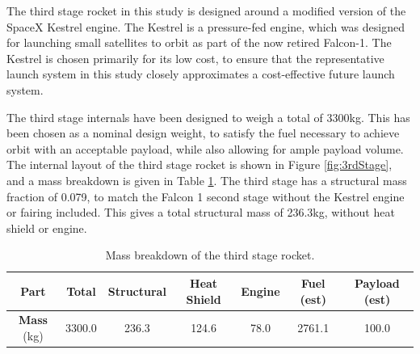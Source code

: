   The third stage rocket in this study is designed around a modified version of the SpaceX Kestrel engine. The Kestrel is a pressure-fed engine, which was designed for launching small satellites to orbit as part of the now retired Falcon-1. The Kestrel is chosen primarily for its low cost, to ensure that the representative launch system in this study closely approximates a cost-effective future launch system.  
  
  
 The third stage internals have been designed to weigh a total of 3300kg. This has been chosen as a nominal design weight, to satisfy the fuel necessary to achieve orbit with an acceptable payload, while also allowing for ample payload volume. The internal layout of the third stage rocket is shown in Figure \ref{fig:3rdStage}, and a mass breakdown is given in Table \ref{tab:MassBreakdown3}. The third stage has a structural mass fraction of 0.079, to match the Falcon 1 second stage without the Kestrel engine or fairing included\cite{Vehicle2008}. This gives a total structural mass of 236.3kg, without heat shield or engine. 
 

 
	\begin{table}[h]
		\centering
		\begin{tabular}{|c|c|c|c|c|c|c|}
			\hline  \textbf{Part} & Total & Structural & Heat Shield & Engine & Fuel (est) & Payload (est) \\ 
			\hline \textbf{Mass} (kg) & 3300.0  & 236.3  & 124.6  & 78.0  & 2761.1 & 100.0\\ 
			\hline 
		\end{tabular} 
		\caption{Mass breakdown of the third stage rocket.} %
		\label{tab:MassBreakdown3}
	\end{table}
 
 
 
 
